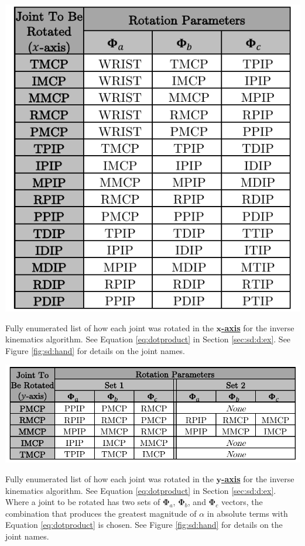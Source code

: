 \begin{table}[!ht]
    \centering
    \includegraphics{figs/general/x_rots.pdf}
    \caption{Fully enumerated list of how each joint was rotated in the \underline{{\bfseries $\bm{x}$-axis}} for the inverse kinematics algorithm. See Equation \ref{eq:dotproduct} in Section \ref{sec:sd:d:ex}. See Figure \ref{fig:sd:hand} for details on the joint names.}
    \label{tb:xrots}
\end{table}

\begin{table}[]
    \centering
    \includegraphics{figs/general/y_rots.pdf}
    \caption{Fully enumerated list of how each joint was rotated in the \underline{{\bfseries $\bm{y}$-axis}} for the inverse kinematics algorithm. See Equation \ref{eq:dotproduct} in Section \ref{sec:sd:d:ex}. Where a joint to be rotated has two sets of $\bm{\Phi}_a$, $\bm{\Phi}_b$, and $\bm{\Phi}_c$ vectors, the combination that produces the greatest magnitude of $\alpha$ in absolute terms with Equation \ref{eq:dotproduct} is chosen. See Figure \ref{fig:sd:hand} for details on the joint names.}
    \label{tb:yrots}
\end{table}

